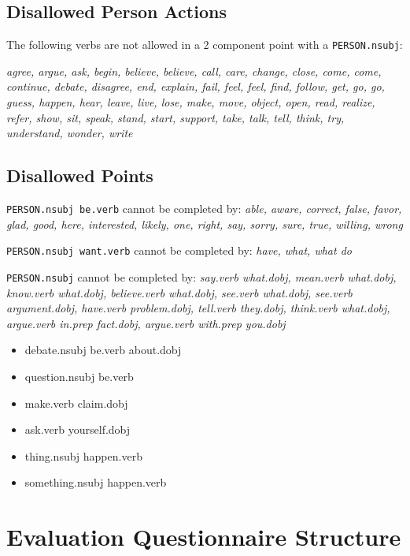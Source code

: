 \begin{appendices}
      \section{Disallowed Person Actions}
        The following verbs are not allowed in a 2 component point with a \texttt{PERSON.nsubj}:

        \textit{agree, argue, ask, begin, believe, believe, call, care, change, close, come, come, continue, debate, disagree, end, explain, fail, feel, feel, find, follow, get, go, go, guess, happen, hear, leave, live, lose, make, move, object, open, read, realize, refer, show, sit, speak, stand, start, support, take, talk, tell, think, try, understand, wonder, write}

      \section{Disallowed Points}
        \texttt{PERSON.nsubj be.verb} cannot be completed by: \textit{able, aware, correct, false, favor, glad, good, here, interested, likely, one, right, say, sorry, sure, true, willing, wrong}

        \noindent\texttt{PERSON.nsubj want.verb} cannot be completed by: \textit{have, what, what do}

        \noindent\texttt{PERSON.nsubj} cannot be completed by: \textit{say.verb what.dobj, mean.verb what.dobj, know.verb what.dobj, believe.verb what.dobj, see.verb what.dobj, see.verb argument.dobj, have.verb problem.dobj, tell.verb they.dobj, think.verb what.dobj, argue.verb in.prep fact.dobj, argue.verb with.prep you.dobj}

        \begin{itemize}
		  \item{debate.nsubj be.verb about.dobj}
		  \item{question.nsubj be.verb}
		  \item{make.verb claim.dobj}
		  \item{ask.verb yourself.dobj}
		  \item{thing.nsubj happen.verb}
		  \item{something.nsubj happen.verb}
        \end{itemize}

    \chapter{Evaluation Questionnaire Structure \label{app:evaluation-questionnaire-layouts}}
\end{appendices}
